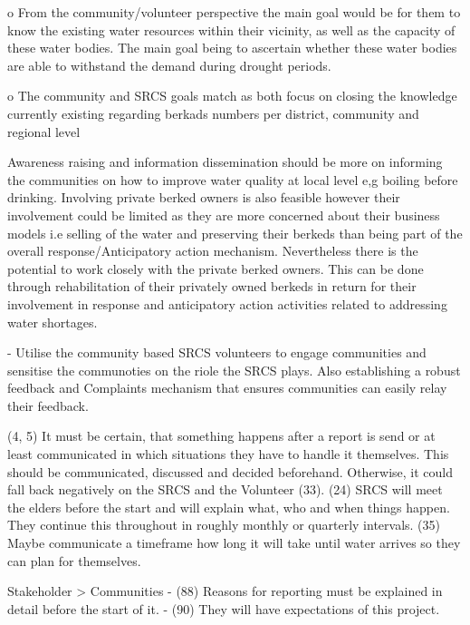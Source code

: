 o	From the community/volunteer perspective the main goal would be for them to know the existing water resources within their vicinity, as well as the capacity of these water bodies. The main goal being to ascertain whether these water bodies are able to withstand the demand during drought periods.

o	The community and SRCS goals match as both focus on closing the knowledge currently existing regarding berkads numbers per district, community and regional level





Awareness raising and information dissemination should be more on informing the communities on how to improve water quality at local level e,g boiling before drinking. Involving private berked owners is also feasible however their involvement could be limited as they are more concerned about their business models i.e selling of the water and preserving their berkeds than being part of the overall response/Anticipatory action mechanism. Nevertheless there is the potential to work closely with the private berked owners. This can be done through rehabilitation of their privately owned berkeds in return for their involvement in response and anticipatory action activities related to addressing water shortages.

-	Utilise the community based SRCS volunteers to engage communities and sensitise the communoties on the riole the SRCS plays. Also establishing a robust feedback and Complaints mechanism that ensures communities can easily relay their feedback.


(4, 5) It must be certain, that something happens after a report is send or at least communicated in which situations they have to handle it themselves. This should be communicated, discussed and decided beforehand. Otherwise, it could fall back negatively on the SRCS and the Volunteer (33).
(24) SRCS will meet the elders before the start and will explain what, who and when things happen. They continue this throughout in roughly monthly or quarterly intervals.
(35) Maybe communicate a timeframe how long it will take until water arrives so they can plan for themselves.

Stakeholder > Communities
-	(88) Reasons for reporting must be explained in detail before the start of it.
-	(90) They will have expectations of this project.


